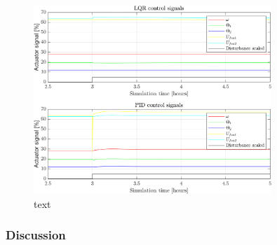\begin{figure}[H]
	\centering
	\includegraphics[width=0.8\textwidth]{Graphics/fig_inputs_stepDist_zoom.png}
	\caption{text}
	\label{fig:inputs_stepDist_zoom}
\end{figure}

\newpage
\subsubsection{Discussion}